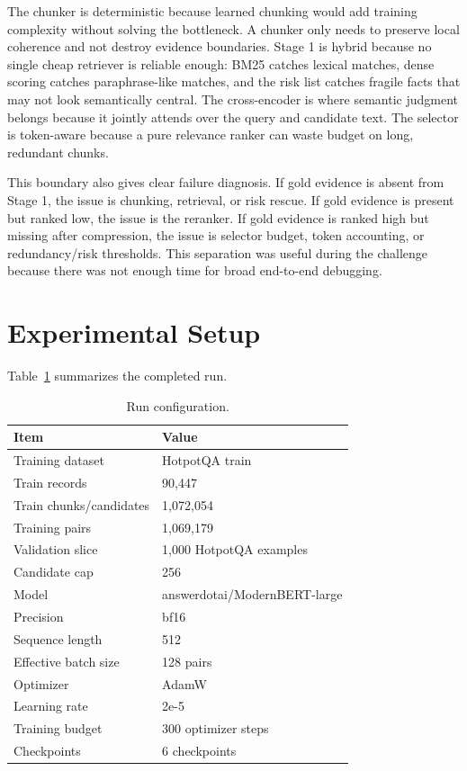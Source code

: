 \documentclass[10pt,twocolumn]{article}
\begin{document}
The chunker is deterministic because learned chunking would add training complexity without solving the bottleneck. A chunker only needs to preserve local coherence and not destroy evidence boundaries. Stage 1 is hybrid because no single cheap retriever is reliable enough: BM25 catches lexical matches, dense scoring catches paraphrase-like matches, and the risk list catches fragile facts that may not look semantically central. The cross-encoder is where semantic judgment belongs because it jointly attends over the query and candidate text. The selector is token-aware because a pure relevance ranker can waste budget on long, redundant chunks.

This boundary also gives clear failure diagnosis. If gold evidence is absent from Stage 1, the issue is chunking, retrieval, or risk rescue. If gold evidence is present but ranked low, the issue is the reranker. If gold evidence is ranked high but missing after compression, the issue is selector budget, token accounting, or redundancy/risk thresholds. This separation was useful during the challenge because there was not enough time for broad end-to-end debugging.

\section{Experimental Setup}
Table~\ref{tab:setup} summarizes the completed run.

\begin{table}[h]
\centering
\small
\begin{tabular}{ll}
\toprule
Item & Value\\
\midrule
Training dataset & HotpotQA train\\
Train records & 90,447\\
Train chunks/candidates & 1,072,054\\
Training pairs & 1,069,179\\
Validation slice & 1,000 HotpotQA examples\\
Candidate cap & 256\\
Model & answerdotai/ModernBERT-large\\
Precision & bf16\\
Sequence length & 512\\
Effective batch size & 128 pairs\\
Optimizer & AdamW\\
Learning rate & 2e-5\\
Training budget & 300 optimizer steps\\
Checkpoints & 6 checkpoints\\
\bottomrule
\end{tabular}
\caption{Run configuration.}
\label{tab:setup}
\end{table}
\end{document}

